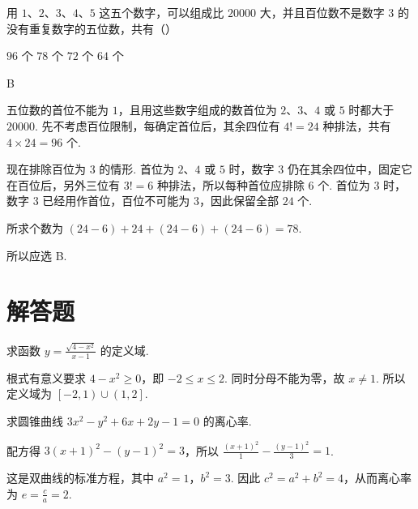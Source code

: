 \begin{problem}

用 \(1\)、\(2\)、\(3\)、\(4\)、\(5\) 这五个数字，可以组成比 \(20000\) 大，并且百位数不是数字 \(3\) 的没有重复数字的五位数，共有（\quad）

\choices
    {\(96\text{ 个}\)}
    {\(78\text{ 个}\)}
    {\(72\text{ 个}\)}
    {\(64\text{ 个}\)}

\begin{answer}
B
\end{answer}

\begin{solution}
五位数的首位不能为 \(1\)，且用这些数字组成的数首位为 \(2\)、\(3\)、\(4\) 或 \(5\) 时都大于 \(20000\). 先不考虑百位限制，每确定首位后，其余四位有 \(4!=24\) 种排法，共有 \(4\times24=96\) 个.

现在排除百位为 \(3\) 的情形. 首位为 \(2\)、\(4\) 或 \(5\) 时，数字 \(3\) 仍在其余四位中，固定它在百位后，另外三位有 \(3!=6\) 种排法，所以每种首位应排除 \(6\) 个. 首位为 \(3\) 时，数字 \(3\) 已经用作首位，百位不可能为 \(3\)，因此保留全部 \(24\) 个.

所求个数为
\(\left(24-6\right)+24+\left(24-6\right)+\left(24-6\right)=78\).

所以应选 B.
\end{solution}
\end{problem}

\section{解答题}

\begin{problem}

求函数 \(y = \frac{\sqrt{4 - x^2}}{x - 1} \) 的定义域.
\end{problem}

\begin{solution}
根式有意义要求 \(4-x^2\geqslant0\)，即 \(-2\leqslant x\leqslant2\). 同时分母不能为零，故 \(x\ne1\). 所以定义域为 \(\left[-2,1\right)\cup\left(1,2\right]\).
\end{solution}

\begin{problem}

求圆锥曲线 \(3x^{2} - y^{2} + 6x + 2y - 1 = 0\) 的离心率.
\end{problem}

\begin{solution}
配方得 \(3\left(x+1\right)^2-\left(y-1\right)^2=3\)，所以
\(\frac{\left(x+1\right)^2}{1}-\frac{\left(y-1\right)^2}{3}=1\).

这是双曲线的标准方程，其中 \(a^2=1\)，\(b^2=3\). 因此 \(c^2=a^2+b^2=4\)，从而离心率为 \(e=\frac{c}{a}=2\).
\end{solution}

